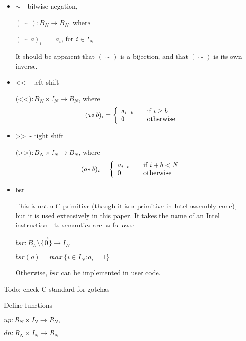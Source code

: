 \documentclass{article}
\begin{document}
\begin{itemize}
\item $\sim$ - bitwise negation, 

$ (\sim) : B_N \rightarrow B_N$, where

$( \sim a)_i = \neg a_i$, for $i \in I_N$

It should be apparent that $(\sim)$ is a bijection, and that $(\sim)$ is its 
own inverse.
\item \textless\textless \,  - left shift

$ ($\textless\textless$) : B_N \times I_N  \rightarrow B_N$, where
\begin{equation*} 
(a \text{\textless\textless} \, b)_i = \left\{
    \begin{array}{l l}
    a_{i-b} & \quad \text{if $i \ge b$}\\
    0 & \quad \text{otherwise}
    \end{array}\right.
\end{equation*}
\item \textgreater\textgreater \,  - right shift

$ ($\textgreater\textgreater$) : B_N \times I_N  \rightarrow B_N$, where
\begin{equation*} 
(a \text{\textgreater\textgreater} \, b)_i = \left\{
    \begin{array}{l l}
    a_{i+b} & \quad \text{if $i+b < N$}\\
    0 & \quad \text{otherwise}
    \end{array}\right.
\end{equation*}
\item bsr

This is not a C primitive
(though it is a primitive in Intel assembly code), 
but it is used extensively in this paper.
It takes the name of an Intel instruction. Its semantics are as 
follows:

$bsr : B_N \setminus \{\vec 0\} \rightarrow I_N$

$bsr(a) = max \,\{ i \in I_N : a_i = 1\} $

Otherwise, $bsr$ can be implemented in user code.
\end{itemize}
Todo: check C standard for gotchas
\vspace{10pt}

Define functions
\vspace{10pt}

$up : B_N \times I_N \rightarrow B_N,$

$dn : B_N \times I_N \rightarrow B_N$
\end{document}
